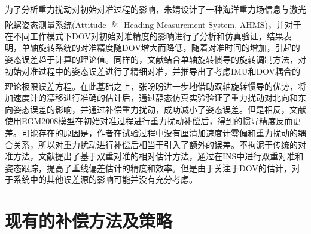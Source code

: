 \documentclass[12pt,a4,utf8]{article}
\newcommand{\upcite}[1]{\textsuperscript{\textsuperscript{\cite{#1}}}} %
\begin{document}
为了分析重力扰动对初始对准过程的影响，朱婧设计了一种海洋重力场信息与激光陀螺姿态测量系统(Attitude $\And$ Heading Measurement System, AHMS)\upcite{1020386196.nh}，并对于在不同工作模式下DOV对初始对准精度的影响进行了分析和仿真验证，结果表明，单轴旋转系统的对准精度随DOV增大而降低，随着对准时间的增加，引起的姿态误差趋于计算的理论值。同样的，文献\cite{hao2022analysis}结合单轴旋转惯导的旋转调制方法，对初始对准过程中的姿态误差进行了精细对准，并推导出了考虑IMU和DOV耦合的理论极限误差方程。在此基础之上，张盼盼进一步地借助双轴旋转惯导的优势\upcite{zhang2023gravity}，将加速度计的漂移进行准确的估计后，通过静态仿真实验验证了重力扰动对北向和东向姿态误差的影响，并通过补偿重力扰动，成功减小了姿态误差。但是相反，文献\cite{TIE2017impact}使用EGM2008模型在初始对准过程进行重力扰动补偿后，得到的惯导精度反而更差。可能存在的原因是，作者在试验过程中没有厘清加速度计零偏和重力扰动的耦合关系，所以对重力扰动进行补偿后相当于引入了额外的误差。不拘泥于传统的对准方法，文献\cite{hao2022analysis}提出了基于双重对准的相对估计方法，通过在INS中进行双重对准和姿态跟踪，提高了垂线偏差估计的精度和效率。但是由于关注于DOV的估计，对于系统中的其他误差源的影响可能并没有充分考虑。

\section{现有的补偿方法及策略}
\end{document}
